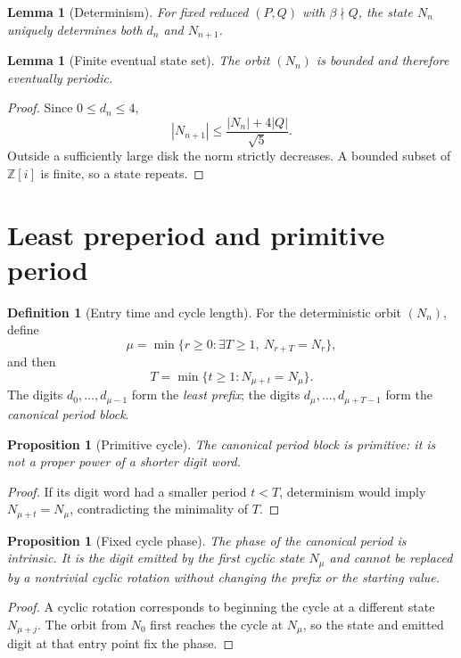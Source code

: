\documentclass[11pt]{article}
\newtheorem{proposition}[theorem]{Proposition}
\newtheorem{lemma}[theorem]{Lemma}
\theoremstyle{definition}
\newtheorem{definition}[theorem]{Definition}
\newcommand{\Zi}{\mathbb{Z}[i]}
\begin{document}
\begin{lemma}[Determinism]
For fixed reduced $(P,Q)$ with $\beta\nmid Q$, the state $N_n$ uniquely determines both $d_n$ and $N_{n+1}$.
\end{lemma}

\begin{lemma}[Finite eventual state set]
The orbit $(N_n)$ is bounded and therefore eventually periodic.
\end{lemma}

\begin{proof}
Since $0\le d_n\le4$,
\[
|N_{n+1}|
\le
\frac{|N_n|+4|Q|}{\sqrt5}.
\]
Outside a sufficiently large disk the norm strictly decreases.  A bounded subset of $\Zi$ is finite, so a state repeats.
\end{proof}

\section{Least preperiod and primitive period}

\begin{definition}[Entry time and cycle length]
For the deterministic orbit $(N_n)$, define
\[
\mu=\min\{r\ge0:\exists T\ge1,\ N_{r+T}=N_r\},
\]
and then
\[
T=\min\{t\ge1:N_{\mu+t}=N_\mu\}.
\]
The digits $d_0,\ldots,d_{\mu-1}$ form the \emph{least prefix}; the digits $d_\mu,\ldots,d_{\mu+T-1}$ form the \emph{canonical period block}.
\end{definition}

\begin{proposition}[Primitive cycle]
The canonical period block is primitive: it is not a proper power of a shorter digit word.
\end{proposition}

\begin{proof}
If its digit word had a smaller period $t<T$, determinism would imply $N_{\mu+t}=N_\mu$, contradicting the minimality of $T$.
\end{proof}

\begin{proposition}[Fixed cycle phase]
The phase of the canonical period is intrinsic.  It is the digit emitted by the first cyclic state $N_\mu$ and cannot be replaced by a nontrivial cyclic rotation without changing the prefix or the starting value.
\end{proposition}

\begin{proof}
A cyclic rotation corresponds to beginning the cycle at a different state $N_{\mu+j}$.  The orbit from $N_0$ first reaches the cycle at $N_\mu$, so the state and emitted digit at that entry point fix the phase.
\end{proof}
\end{document}
